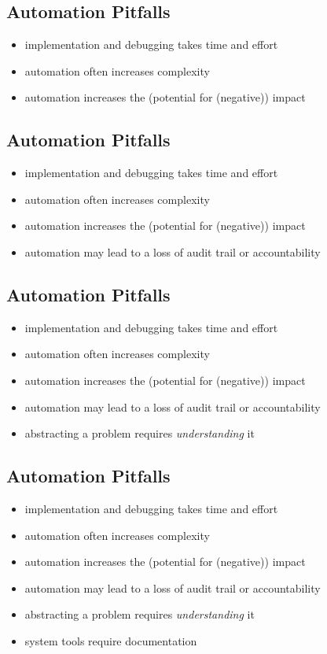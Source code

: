 \documentclass[xga]{xdvislides}
\begin{document}
\subsection{Automation Pitfalls}
\begin{itemize}
	\item implementation and debugging takes time and effort
	\item automation often increases complexity
	\item automation increases the (potential for (negative)) impact
\end{itemize}

\subsection{Automation Pitfalls}
\begin{itemize}
	\item implementation and debugging takes time and effort
	\item automation often increases complexity
	\item automation increases the (potential for (negative)) impact
	\item automation may lead to a loss of audit trail or accountability
\end{itemize}

\subsection{Automation Pitfalls}
\begin{itemize}
	\item implementation and debugging takes time and effort
	\item automation often increases complexity
	\item automation increases the (potential for (negative)) impact
	\item automation may lead to a loss of audit trail or accountability
	\item abstracting a problem requires {\em understanding} it
\end{itemize}


\subsection{Automation Pitfalls}
\begin{itemize}
	\item implementation and debugging takes time and effort
	\item automation often increases complexity
	\item automation increases the (potential for (negative)) impact
	\item automation may lead to a loss of audit trail or accountability
	\item abstracting a problem requires {\em understanding} it
	\item system tools require documentation
\end{itemize}
\end{document}
